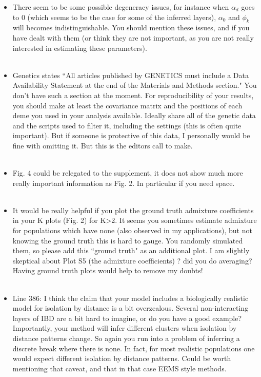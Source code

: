 \documentclass[11pt]{letter}
\newcommand{\gb}[1]{{\bf\color{black}{#1}}}
\begin{document}
\begin{itemize}
\item There seem to be some possible degeneracy issues, 
for instance when $\alpha_d$ goes to 0 (which seems to be the case for some of the inferred layers), 
$\alpha_0$ and $\phi_k$ will becomes indistinguishable.
 You should mention these issues, and if you have dealt with them 
 (or think they are not important, as you are not really interested in estimating these parameters).\\\\
\gb{RESPONSE.}
 
\item Genetics states ``All articles published by GENETICS must include a 
Data Availability Statement at the end of the Materials and Methods section." 
You don't have such a section at the moment.
For reproducibility of your results, 
you should make at least the covariance matrix and the positions of each deme you used in your analysis available. 
Ideally share all of the genetic data and the scripts used to filter it, including the settings (this is often quite important). 
But if someone is protective of this data, I personally would be fine with omitting it. But this is the editors call to make.\\\\
\gb{RESPONSE.}

\item Fig. 4 could be relegated to the supplement, it does not show much more really important information as Fig. 2. 
 In particular if you need space.\\\\
\gb{RESPONSE.}

\item It would be really helpful if you plot the ground truth admixture coefficients in your K plots (Fig. 2) for K>2. 
 It seems you sometimes estimate admixture for populations which have none (also observed in my applications), 
 but not knowing the ground truth this is hard to gauge. 
 You randomly simulated them, so please add this ``ground truth" as an additional plot. 
 I am slightly skeptical about Plot S5 (the admixture coefficients) ? did you do averaging? 
 Having ground truth plots would help to remove my doubts!\\\\
\gb{RESPONSE.}

\item  Line 386: I think the claim that your model includes a biologically realistic model for isolation by distance is a bit overzealous. 
 Several non-interacting layers of IBD are a bit hard to imagine, 
 or do you have a good example?
 Importantly, your method will infer different clusters when isolation by distance patterns change. 
 So again you run into a problem of inferring a discrete break where there is none. 
 In fact, for most realistic populations one would expect different isolation by distance patterns.
  Could be worth mentioning that caveat, and that in that case EEMS style methods.\\\\
\gb{RESPONSE.}


\end{itemize}
\end{document}
